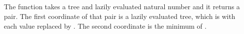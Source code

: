 \begin{code}%
\>[0]\AgdaSpace{}%
\AgdaSymbol{:}\AgdaSpace{}%
\AgdaSymbol{(}\AgdaSymbol{(}\AgdaSpace{}%
\AgdaSymbol{)}\AgdaSpace{}%
\AgdaSpace{}%
\AgdaSpace{}%
\AgdaSymbol{(}\AgdaSpace{}%
\AgdaSymbol{))}\<%
\\
\>[0]\AgdaSpace{}%
\AgdaSpace{}%
\AgdaSymbol{=}\AgdaSpace{}%
\AgdaSpace{}%
\AgdaSpace{}%
\AgdaSpace{}%
\<%
\\
%
\\[\AgdaEmptyExtraSkip]%
\>[0]\AgdaSpace{}%
\AgdaSymbol{:}\AgdaSpace{}%
\AgdaSymbol{(}\AgdaSymbol{(}\AgdaSpace{}%
\AgdaSymbol{)}\AgdaSpace{}%
\AgdaSpace{}%
\AgdaSymbol{(}\AgdaSpace{}%
\AgdaSymbol{)}\AgdaSpace{}%
\AgdaSpace{}%
\AgdaSymbol{(}\AgdaSpace{}%
\AgdaSymbol{))}\<%
\\
\>[0]\AgdaSpace{}%
\AgdaSpace{}%
\AgdaSpace{}%
\AgdaSymbol{=}\AgdaSpace{}%
\AgdaSpace{}%
\AgdaSpace{}%
\AgdaSpace{}%
\AgdaSpace{}%
\AgdaSpace{}%
\<%
\end{code}

The function  takes a tree  and lazily evaluated natural number  and it returns a pair.
The first coordinate of that pair is a lazily evaluated tree, which is  with each value replaced by .
The second coordinate is the minimum of .


